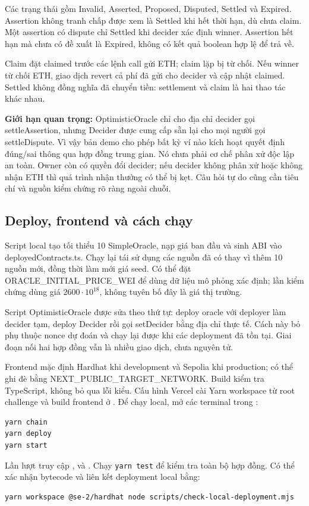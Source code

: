 Các trạng thái gồm Invalid, Asserted, Proposed, Disputed, Settled và Expired. Assertion không tranh chấp được xem là Settled khi hết thời hạn, dù chưa claim. Một assertion có dispute chỉ Settled khi decider xác định winner. Assertion hết hạn mà chưa có đề xuất là Expired, không có kết quả boolean hợp lệ để trả về.

Claim đặt claimed trước các lệnh call gửi ETH; claim lặp bị từ chối. Nếu winner từ chối ETH, giao dịch revert cả phí đã gửi cho decider và cập nhật claimed. Settled không đồng nghĩa đã chuyển tiền: settlement và claim là hai thao tác khác nhau.

\textbf{Giới hạn quan trọng:} OptimisticOracle chỉ cho địa chỉ decider gọi settleAssertion, nhưng Decider được cung cấp sẵn lại cho mọi người gọi settleDispute. Vì vậy bản demo cho phép bất kỳ ví nào kích hoạt quyết định đúng/sai thông qua hợp đồng trung gian. Nó chưa phải cơ chế phân xử độc lập an toàn. Owner còn có quyền đổi decider; nếu decider không phân xử hoặc không nhận ETH thì quá trình nhận thưởng có thể bị kẹt. Câu hỏi tự do cũng cần tiêu chí và nguồn kiểm chứng rõ ràng ngoài chuỗi.

\subsection{Deploy, frontend và cách chạy}

Script local tạo tối thiểu 10 SimpleOracle, nạp giá ban đầu và sinh ABI vào deployedContracts.ts. Chạy lại tái sử dụng các nguồn đã có thay vì thêm 10 nguồn mới, đồng thời làm mới giá seed. Có thể đặt ORACLE\_INITIAL\_PRICE\_WEI để dùng dữ liệu mô phỏng xác định; lần kiểm chứng dùng giá $2600\cdot10^{18}$, không tuyên bố đây là giá thị trường.

Script OptimisticOracle được sửa theo thứ tự: deploy oracle với deployer làm decider tạm, deploy Decider rồi gọi setDecider bằng địa chỉ thực tế. Cách này bỏ phụ thuộc nonce dự đoán và chạy lại được khi các deployment đã tồn tại. Giai đoạn nối hai hợp đồng vẫn là nhiều giao dịch, chưa nguyên tử.

Frontend mặc định Hardhat khi development và Sepolia khi production; có thể ghi đè bằng NEXT\_PUBLIC\_TARGET\_NETWORK. Build kiểm tra TypeScript, không bỏ qua lỗi kiểu. Cấu hình Vercel cài Yarn workspace từ root challenge và build frontend ở . Để chạy local, mở các terminal trong :
\begin{verbatim}
yarn chain
yarn deploy
yarn start
\end{verbatim}
Lần lượt truy cập ,  và . Chạy \texttt{yarn test} để kiểm tra toàn bộ hợp đồng. Có thể xác nhận bytecode và liên kết deployment local bằng:
\begin{verbatim}
yarn workspace @se-2/hardhat node scripts/check-local-deployment.mjs
\end{verbatim}

